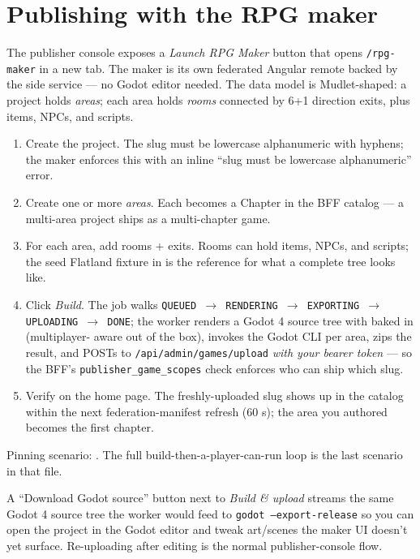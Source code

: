 \documentclass[11pt,a4paper,openany]{book}
\begin{document}
\chapter{Publishing with the RPG maker}
The publisher console exposes a \emph{Launch RPG Maker} button that
opens \texttt{/rpg-maker} in a new tab. The maker is its own federated
Angular remote backed by the  side service ---
no Godot editor needed. The data model is Mudlet-shaped: a project
holds \emph{areas}; each area holds \emph{rooms} connected by 6+1
direction exits, plus items, NPCs, and scripts.

\begin{enumerate}
  \item Create the project. The slug must be lowercase alphanumeric
        with hyphens; the maker enforces this with an inline
        ``slug must be lowercase alphanumeric'' error.
  \item Create one or more \emph{areas}. Each becomes a Chapter in the
        BFF catalog --- a multi-area project ships as a multi-chapter
        game.
  \item For each area, add rooms + exits. Rooms can hold items, NPCs,
        and scripts; the seed Flatland fixture in
        is the reference for what a complete tree looks like.
  \item Click \emph{Build}. The job walks
        \texttt{QUEUED $\rightarrow$ RENDERING $\rightarrow$
        EXPORTING $\rightarrow$ UPLOADING $\rightarrow$ DONE}; the
        worker renders a Godot 4 source tree with
         baked in (multiplayer-
        aware out of the box), invokes the Godot CLI per area, zips
        the result, and POSTs to \texttt{/api/admin/games/upload}
        \emph{with your bearer token} --- so the BFF's
        \texttt{publisher\_game\_scopes} check enforces who can ship
        which slug.
  \item Verify on the home page. The freshly-uploaded slug shows up
        in the catalog within the next federation-manifest refresh
        (60 s); the area you authored becomes the first chapter.
\end{enumerate}

Pinning scenario:
. The full
build-then-a-player-can-run loop is the last scenario in that file.

A ``Download Godot source'' button next to \emph{Build \& upload}
streams the same Godot 4 source tree the worker would feed to
\texttt{godot --export-release} so you can open the project in the
Godot editor and tweak art/scenes the maker UI doesn't yet surface.
Re-uploading after editing is the normal publisher-console flow.
\end{document}
